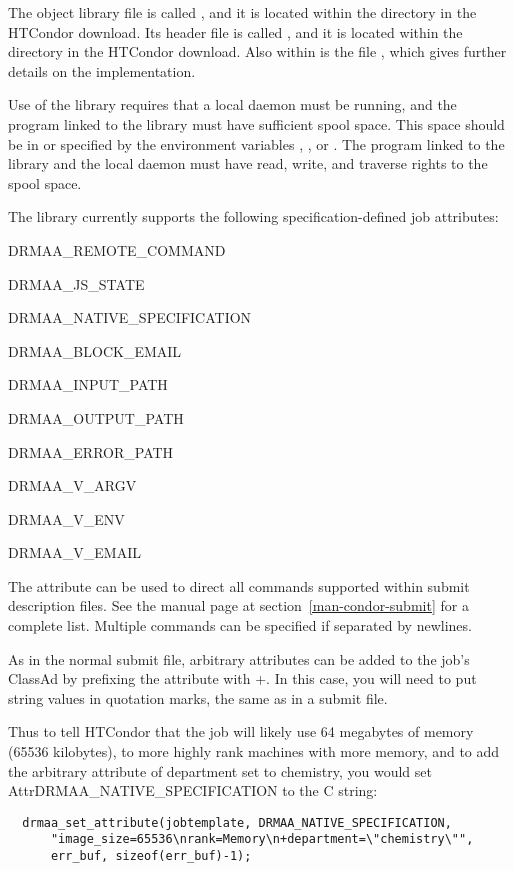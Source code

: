 The object library file is called ,
and it is located within
the  directory in the HTCondor download.
Its header file  is called , and it is located within
the  directory in the HTCondor download.
Also within  is the file
,
which gives further details on the implementation.

Use of the library requires that a
local  daemon  must be running,
and the program linked to the library must have
sufficient spool space.
This space should be in 
or specified by the environment variables
, , or .
The program linked to the library and the local  daemon
must have read, write, and traverse rights to the spool space.

The library currently supports the following specification-defined
job attributes:
\begin{description}
\item{DRMAA\_REMOTE\_COMMAND}
\item{DRMAA\_JS\_STATE}
\item{DRMAA\_NATIVE\_SPECIFICATION}
\item{DRMAA\_BLOCK\_EMAIL}
\item{DRMAA\_INPUT\_PATH}
\item{DRMAA\_OUTPUT\_PATH}
\item{DRMAA\_ERROR\_PATH}
\item{DRMAA\_V\_ARGV}
\item{DRMAA\_V\_ENV}
\item{DRMAA\_V\_EMAIL}
\end{description}

The attribute  can be used
to direct all commands supported within
submit description files.  
See the  manual page at
section~\ref{man-condor-submit} for a complete list.
Multiple commands can be specified if separated by newlines.  

As in the normal submit file,
arbitrary attributes can be added to the job's ClassAd
by prefixing the attribute with +.  In this case, you will need to put
string values in quotation marks, the same as in a submit file.

Thus to tell HTCondor that the job will likely use 64 megabytes of memory (65536
kilobytes), to more highly rank machines with more memory, and to add the
arbitrary attribute of department set to chemistry, you would set
Attr{DRMAA\_NATIVE\_SPECIFICATION} to the C string:

\begin{verbatim}
  drmaa_set_attribute(jobtemplate, DRMAA_NATIVE_SPECIFICATION,
      "image_size=65536\nrank=Memory\n+department=\"chemistry\"",
      err_buf, sizeof(err_buf)-1);

\end{verbatim}

